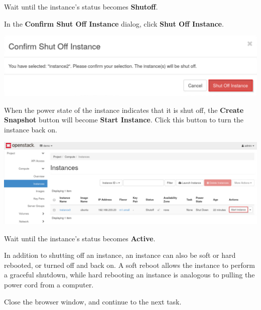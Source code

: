 \documentclass[letterpaper, 12pt]{article}
\begin{document}
\begin{enumerate}
    \begin{stopbox}
        Wait until the instance's status becomes \textbf{Shutoff}.
    \end{stopbox}

    \begin{labstep}
        In the \textbf{Confirm Shut Off Instance} dialog, click \textbf{Shut Off Instance}.

        \begin{center}
            \includegraphics[width=\linewidth]{images/part3/step18.png}
        \end{center}
    \end{labstep}

    \begin{labstep}
        When the power state of the instance indicates that it is shut off, the \textbf{Create Snapshot} button will become \textbf{Start Instance}.
        Click this button to turn the instance back on.

        \begin{center}
            \includegraphics[width=\linewidth]{images/part3/step19.png}
        \end{center}
    \end{labstep}

    \begin{stopbox}
        Wait until the instance's status becomes \textbf{Active}.
    \end{stopbox}
    \begin{tipbox}
        In addition to shutting off an instance, an instance can also be soft or hard rebooted, or turned off and back on.
        A soft reboot allows the instance to perform a graceful shutdown, while hard rebooting an instance is analogous to pulling the power cord from a computer.
    \end{tipbox}

    \begin{labstep}
        Close the browser window, and continue to the next task.
    \end{labstep}

\end{enumerate}
\end{document}
